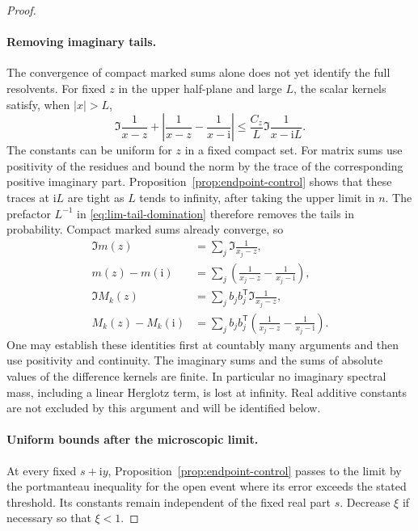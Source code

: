 \begin{proof}
\paragraph{Removing imaginary tails.}
The convergence of compact marked sums alone does not yet identify
the full resolvents. For fixed \(z\) in the upper half-plane and
large \(L\), the scalar kernels satisfy, when \(|x|>L\),
\begin{equation}\label{eq:lim-tail-domination}
 \Im\frac1{x-z}
 +\left|\frac1{x-z}-\frac1{x-\mathrm i}\right|
 \le \frac{C_z}{L}\Im\frac1{x-\mathrm i L}.
\end{equation}
The constants can be uniform for \(z\) in a fixed compact set.
For matrix sums use positivity of the residues and bound the norm
by the trace of the corresponding positive imaginary part.
Proposition~\ref{prop:endpoint-control} shows that these traces at
\(\mathrm i L\) are tight as \(L\) tends to infinity, after taking
the upper limit in \(n\). The prefactor \(L^{-1}\) in
\eqref{eq:lim-tail-domination} therefore removes the tails in
probability. Compact marked sums already converge, so
\begin{equation}\label{eq:lim-difference-identities}
 \begin{split}
  \Im m(z)&=\sum_j\Im\frac1{x_j-z},\\
  m(z)-m(\mathrm i)
    &=\sum_j\left(\frac1{x_j-z}-\frac1{x_j-\mathrm i}\right),\\
  \Im M_k(z)&=\sum_j b_jb_j^{\mathsf T}
                            \Im\frac1{x_j-z},\\
  M_k(z)-M_k(\mathrm i)
    &=\sum_j b_jb_j^{\mathsf T}
               \left(\frac1{x_j-z}-\frac1{x_j-\mathrm i}\right).
 \end{split}
\end{equation}
One may establish these identities first at countably many
arguments and then use positivity and continuity. The imaginary
sums and the sums of absolute values of the difference kernels are
finite. In particular no imaginary spectral mass, including a
linear Herglotz term, is lost at infinity. Real additive constants
are not excluded by this argument and will be identified below.

\paragraph{Uniform bounds after the microscopic limit.}
At every fixed \(s+\mathrm i y\),
Proposition~\ref{prop:endpoint-control} passes to the limit by the
portmanteau inequality for the open event where its error exceeds
the stated threshold. Its constants remain independent of the
fixed real part \(s\). Decrease \(\xi\) if necessary so that
\(\xi<1\).


\end{proof}
